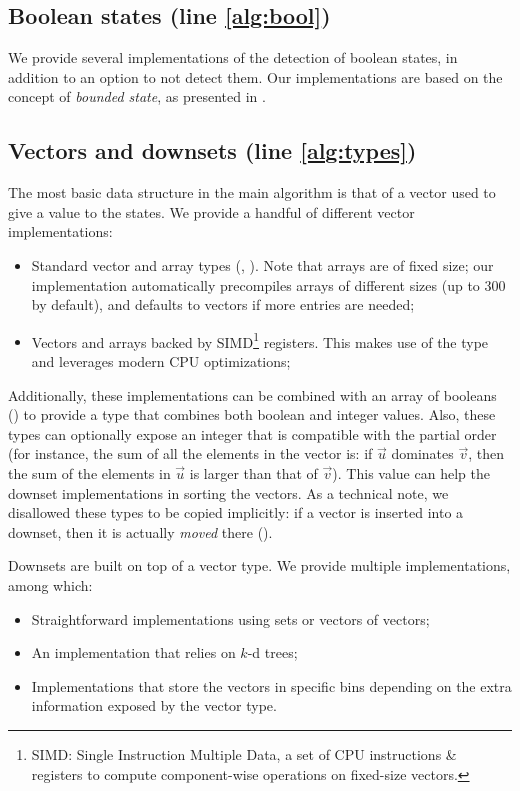 \documentclass[sigconf,screen,nonacm]{acmart}
\begin{document}
\subsection{Boolean states (line \ref{alg:bool})}

We provide several implementations of the detection of boolean states, in
addition to an option to not detect them.  Our implementations are based on the
concept of \emph{bounded state}, as presented in \cite{...}.

\subsection{Vectors and downsets (line \ref{alg:types})}

The most basic data structure in the main algorithm is that of a vector used to
give a value to the states.  We provide a handful of different vector
implementations:
\begin{itemize}
\item Standard vector and array types (,
  ).  Note that arrays are of fixed size; our implementation
  automatically precompiles arrays of different sizes (up to \(300\) by default),
  and defaults to vectors if more entries are needed;
\item Vectors and arrays backed by SIMD\footnote{SIMD: Single Instruction
    Multiple Data, a set of CPU instructions \& registers to compute
    component-wise operations on fixed-size vectors.} registers.  This makes use of the
   type and leverages modern CPU optimizations;
\end{itemize}

Additionally, these implementations can be combined with an array of booleans
() to provide a type that combines both boolean and integer
values.  Also, these types can optionally expose an integer that is compatible
with the partial order (for instance, the sum of all the elements in the vector
is: if \(\vec{u}\) dominates \(\vec{v}\), then the sum of the elements in \(\vec{u}\)
is larger than that of \(\vec{v}\)).  This value can help the downset
implementations in sorting the vectors.  As a technical note, we disallowed
these types to be copied implicitly: if a vector is inserted into a downset,
then it is actually \emph{moved} there ().

Downsets are built on top of a vector type.  We provide multiple
implementations, among which:
\begin{itemize}
\item Straightforward implementations using sets or vectors of vectors;
\item An implementation that relies on \(k\)-d trees;
\item Implementations that store the vectors in specific bins depending on the
  extra information exposed by the vector type.
\end{itemize}
\end{document}
